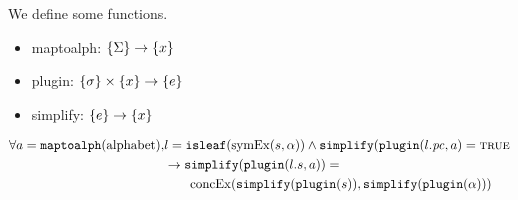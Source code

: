 \begin{property}[Commutativity]

  We define some functions.
  \begin{itemize}
  \item maptoalph: $\{\Sigma\} \rightarrow \{x\}$
  \item plugin: $\{\sigma\} \times \{x\} \rightarrow
    \{e\}$
  \item simplify: $\{e\} \rightarrow \{x\}$
  \end{itemize}




\begin{align*}
\forall a = \mathtt{maptoalph}(\mathrm{alphabet}), & l =
\mathtt{isleaf}(\mathrm{symEx}(s,\alpha)) \wedge
\mathtt{simplify}(\mathtt{plugin}(l.\mathit{pc},a) = \mathtt{\textsc{true}} \\
&\rightarrow \mathtt{simplify}(\mathtt{plugin}(l.s,a)) = \\
&\qquad\mathrm{concEx}(\mathtt{simplify}(\mathtt{plugin}(s)),\mathtt{simplify}(\mathtt{plugin}(\alpha)))
\end{align*}
\end{property}



